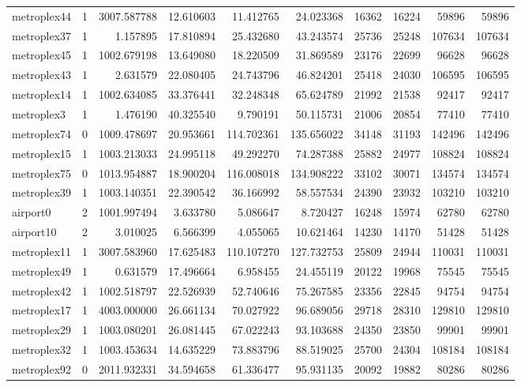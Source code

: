 \begin{longtable}{|l|r|r|r|r|r|r|r|r|r|}
metroplex44 & 1 & 3007.587788 & 12.610603 & 11.412765 & 24.023368 & 16362 & 16224 & 59896 & 59896 \\
metroplex37 & 1 & 1.157895 & 17.810894 & 25.432680 & 43.243574 & 25736 & 25248 & 107634 & 107634 \\
metroplex45 & 1 & 1002.679198 & 13.649080 & 18.220509 & 31.869589 & 23176 & 22699 & 96628 & 96628 \\
metroplex43 & 1 & 2.631579 & 22.080405 & 24.743796 & 46.824201 & 25418 & 24030 & 106595 & 106595 \\
metroplex14 & 1 & 1002.634085 & 33.376441 & 32.248348 & 65.624789 & 21992 & 21538 & 92417 & 92417 \\
metroplex3 & 1 & 1.476190 & 40.325540 & 9.790191 & 50.115731 & 21006 & 20854 & 77410 & 77410 \\
metroplex74 & 0 & 1009.478697 & 20.953661 & 114.702361 & 135.656022 & 34148 & 31193 & 142496 & 142496 \\
metroplex15 & 1 & 1003.213033 & 24.995118 & 49.292270 & 74.287388 & 25882 & 24977 & 108824 & 108824 \\
metroplex75 & 0 & 1013.954887 & 18.900204 & 116.008018 & 134.908222 & 33102 & 30071 & 134574 & 134574 \\
metroplex39 & 1 & 1003.140351 & 22.390542 & 36.166992 & 58.557534 & 24390 & 23932 & 103210 & 103210 \\
airport0 & 2 & 1001.997494 & 3.633780 & 5.086647 & 8.720427 & 16248 & 15974 & 62780 & 62780 \\
airport10 & 2 & 3.010025 & 6.566399 & 4.055065 & 10.621464 & 14230 & 14170 & 51428 & 51428 \\
metroplex11 & 1 & 3007.583960 & 17.625483 & 110.107270 & 127.732753 & 25809 & 24944 & 110031 & 110031 \\
metroplex49 & 1 & 0.631579 & 17.496664 & 6.958455 & 24.455119 & 20122 & 19968 & 75545 & 75545 \\
metroplex42 & 1 & 1002.518797 & 22.526939 & 52.740646 & 75.267585 & 23356 & 22845 & 94754 & 94754 \\
metroplex17 & 1 & 4003.000000 & 26.661134 & 70.027922 & 96.689056 & 29718 & 28310 & 129810 & 129810 \\
metroplex29 & 1 & 1003.080201 & 26.081445 & 67.022243 & 93.103688 & 24350 & 23850 & 99901 & 99901 \\
metroplex32 & 1 & 1003.453634 & 14.635229 & 73.883796 & 88.519025 & 25700 & 24304 & 108184 & 108184 \\
metroplex92 & 0 & 2011.932331 & 34.594658 & 61.336477 & 95.931135 & 20092 & 19882 & 80286 & 80286 \\

\end{longtable}
